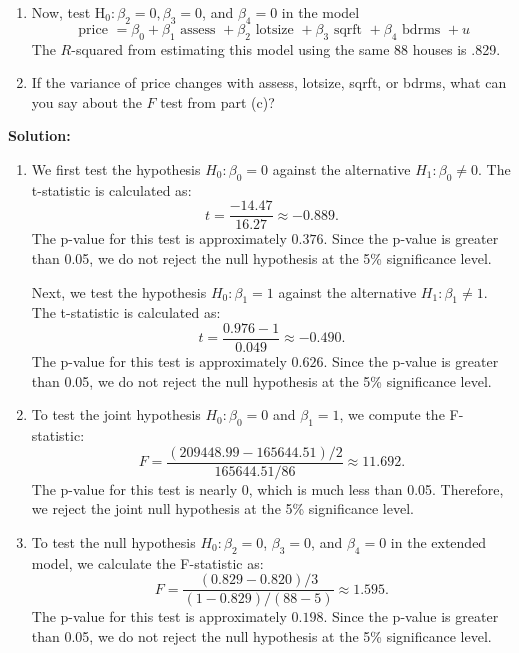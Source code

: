 \documentclass[12pt]{article}
\begin{document}
\begin{enumerate}
\begin{enumerate}
\item Now, test $\mathrm{H}_0: \beta_2=0, \beta_3=0$, and $\beta_4=0$ in the model
$$
\text { price }=\beta_0+\beta_1 \text { assess }+\beta_2 \text { lotsize }+\beta_3 \text { sqrft }+\beta_4 \text { bdrms }+u
$$
The $R$-squared from estimating this model using the same 88 houses is .829.

\item If the variance of price changes with assess, lotsize, sqrft, or bdrms, what can you say about the $F$ test from part (c)?
\end{enumerate}



{\color{blue}
\noindent \textbf{Solution:}

\begin{enumerate}

    \item We first test the hypothesis \( H_0: \beta_0 = 0 \) against the alternative \( H_1: \beta_0 \neq 0 \). The t-statistic is calculated as:
    \[
    t = \frac{-14.47}{16.27} \approx -0.889.
    \]
    The p-value for this test is approximately \( 0.376 \). Since the p-value is greater than 0.05, we do not reject the null hypothesis at the 5\% significance level.

    Next, we test the hypothesis \( H_0: \beta_1 = 1 \) against the alternative \( H_1: \beta_1 \neq 1 \). The t-statistic is calculated as:
    \[
    t = \frac{0.976 - 1}{0.049} \approx -0.490.
    \]
    The p-value for this test is approximately \( 0.626 \). Since the p-value is greater than 0.05, we do not reject the null hypothesis at the 5\% significance level.

    \item To test the joint hypothesis \( H_0: \beta_0 = 0 \) and \( \beta_1 = 1 \), we compute the F-statistic:
    \[
    F = \frac{\left(209448.99 - 165644.51\right)/2}{165644.51 / 86} \approx 11.692.
    \]
    The p-value for this test is nearly 0, which is much less than 0.05. Therefore, we reject the joint null hypothesis at the 5\% significance level.

    \item To test the null hypothesis \( H_0: \beta_2 = 0 \), \( \beta_3 = 0 \), and \( \beta_4 = 0 \) in the extended model, we calculate the F-statistic as:
    \[
    F = \frac{\left(0.829 - 0.820\right)/3}{(1 - 0.829)/(88 - 5)} \approx 1.595.
    \]
    The p-value for this test is approximately \( 0.198 \). Since the p-value is greater than 0.05, we do not reject the null hypothesis at the 5\% significance level.


\end{enumerate}}
\end{enumerate}
\end{document}
